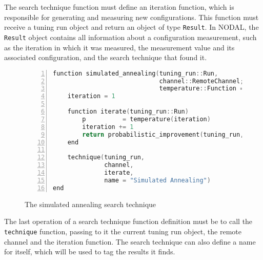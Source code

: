 The search technique function must define an iteration function, which is
responsible for generating and measuring new configurations.  This function
must receive a tuning run object and return an object of type \texttt{Result}.
In NODAL, the \texttt{Result} object contains all information about a
configuration measurement, such as the iteration in which it was measured, the
measurement value and its associated configuration, and the search technique
that found it.

\begin{figure}[htpb]
    \begin{minipage}{\linewidth}
    \begin{lstlisting}[language=C, basicstyle=\ttfamily\scriptsize,
        numbers=left,
        frame=no, showspaces=false, showstringspaces=false,
        numberstyle=\scriptsize,
        xleftmargin=1.5cm,
        keywords={%
            @spawnat, remotecall, Nullable, Any,
            @fetch, Future, Array, Float64, julia,
            while, true, function, end, put!,
            take!, sleep, RemoteChannel, Channel,
            Int, Tuple, const, addprocs, @schedule,
            @everywhere, for, in, myid, @async,
            remote_do, workers, Result, Real,
            AbstractFloat, deepcopy, rand, exp, true,
            Function, false, Run, return%
        },
        otherkeywords={::, \&, \*, +, -, /, [, ], >, <, put!, take!, neighbor!,
                       update!}
    ]
function simulated_annealing(tuning_run::Run,
                             channel::RemoteChannel;
                             temperature::Function = log_temperature)
    iteration = 1

    function iterate(tuning_run::Run)
        p          = temperature(iteration)
        iteration += 1
        return probabilistic_improvement(tuning_run, threshold = p)
    end

    technique(tuning_run,
              channel,
              iterate,
              name = "Simulated Annealing")
end
    \end{lstlisting}
    \end{minipage}
    \caption{The simulated annealing search technique}
    \label{fig:simulated_annealing}
\end{figure}

The last operation of a search technique function definition must be to call
the \texttt{technique} function, passing to it the current tuning run object,
the remote channel and the iteration function. The search technique can also
define a name for itself, which will be used to tag the results it finds.

